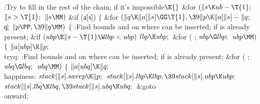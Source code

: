 \Y\B\4:Try to fill in the rest of the chain;  if it's
impossible\X${}\E{}$\6
\&{for} ${}(\|s\K\\{ub}-\T{1};{}$ ${}\|s>\T{1};{}$ ${}\|s\MM){}$\1\6
\&{if} (\|a[\|s])\5
${}\{{}$\1\6
\&{for} ${}(\|q\K\|a[\|s]\GG\T{1},\39\|p\K\|a[\|s]-\|q;{}$ \|q; ${}\|p\PP,\39%
\|q\MM){}$\5
${}\{{}$\1\6
:Find bounds  and  on where  can be
inserted;  if  is already present\X;\6
\&{if} ${}(\\{ubp}\E\|s-\T{1}\W\\{lbp}<\\{ubp}){}$\1\5
${}\\{lbp}\K\\{ubp};{}$\2\6
\&{for} ( ; ${}\\{ubp}\G\\{lbp};{}$ ${}\\{ubp}\MM){}$\5
${}\{{}$\1\6
${}\|a[\\{ubp}]\K\|p;{}$\6
\4\\{tryq}:\5
:Find bounds  and  on where  can be
inserted;  if  is already present\X;\6
\&{for} ( ; ${}\\{ubq}\G\\{lbq};{}$ ${}\\{ubq}\MM){}$\5
${}\{{}$\1\6
${}\|a[\\{ubq}]\K\|q;{}$\6
\4\\{happiness}:\5
${}\\{stack}[\|s].\\{savep}\K\|p;{}$\6
${}\\{stack}[\|s].\\{lbp}\K\\{lbp},\39\\{stack}[\|s].\\{ubp}\K\\{ubp};{}$\6
${}\\{stack}[\|s].\\{lbq}\K\\{lbq},\39\\{stack}[\|s].\\{ubq}\K\\{ubq};{}$\6
\&{goto} \\{onward};\6
